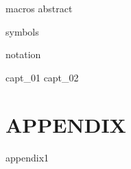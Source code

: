 \documentclass[11pt,oneside,english]{book}
\begin{document}



\runfrontend{}

{macros}
{abstract}

\sumario

\listadefiguras

\listadetabelas

\listadeacronimos


\markboth{}{}

{symbols}

{notation}

\mainmatter 
\setcounter{page}{1} \pagestyle{plain} 

{capt_01}
{capt_02}


%


\part*{APPENDIX}
\appendix
{appendix1}
\end{document}
